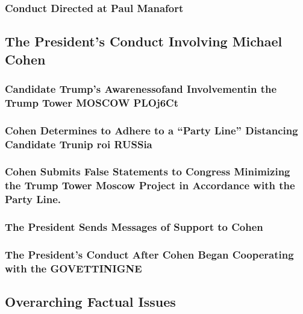 \subsubsection{Conduct Directed at Paul Manafort}

\subsection{The President’s Conduct Involving Michael Cohen}

\subsubsection{Candidate Trump’s Awarenessofand Involvementin the Trump Tower MOSCOW PLOj6Ct}

\subsubsection{Cohen Determines to Adhere to a “Party Line” Distancing Candidate Trunip roi RUSSia}

\subsubsection{Cohen Submits False Statements to Congress Minimizing the Trump Tower Moscow Project in Accordance with the Party Line.}

\subsubsection{The President Sends Messages of Support to Cohen}

\subsubsection{The President’s Conduct After Cohen Began Cooperating with the GOVETTINIGNE}

\subsection{Overarching Factual Issues}
